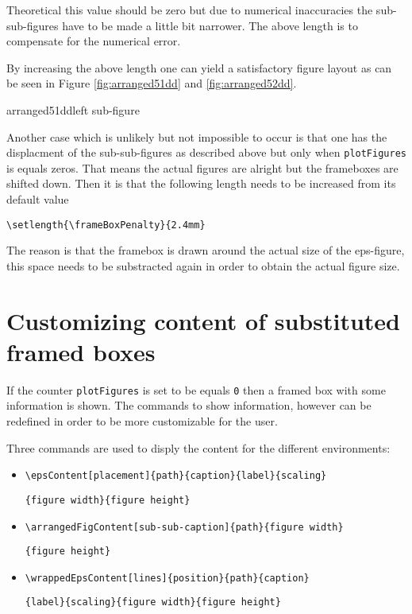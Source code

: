 \documentclass[12pt,a4paper]{article}
\newcommand{\comm}[1]{\texttt{#1}}
\begin{document}
Theoretical this value should be zero but due to numerical inaccuracies the 
sub-sub-figures have to be made a little bit narrower. The above length is to 
compensate for the numerical error.

By increasing the above length one can yield a satisfactory figure layout as 
can be seen in Figure \ref{fig:arranged51dd} and \ref{fig:arranged52dd}.

\begin{arrangedFigure}{2}{2}{arranged51dd}{left sub-figure}
\end{arrangedFigure}


Another case which is unlikely but not impossible to occur is that one has 
the displacment of the sub-sub-figures as described above but 
only when \comm{plotFigures} is equals zeros. That means the actual figures
are alright but the frameboxes are shifted down. Then it is that 
the following length needs to be increased from its default value

\begin{verbatim}
\setlength{\frameBoxPenalty}{2.4mm}
\end{verbatim}

The reason is that the framebox is drawn around the actual size of the 
eps-figure, this space needs to be substracted again in order to obtain the
actual figure size.


\clearpage







\section{Customizing content of substituted framed boxes}

If the counter \comm{plotFigures} is set to be equals \comm{0} then a framed 
box with some information is shown. The commands to show information, however can 
be redefined in order to be more customizable for the user.

Three commands are used to disply the content for the different environments:

\begin{itemize}
  \item \verb+\epsContent[placement]{path}{caption}{label}{scaling}+\par\verb+{figure width}{figure height}+
  \item \verb+\arrangedFigContent[sub-sub-caption]{path}{figure width}+\par\verb+{figure height}+
  \item \verb+\wrappedEpsContent[lines]{position}{path}{caption}+\par\verb+{label}{scaling}{figure width}{figure height}+
\end{itemize}
\end{document}
